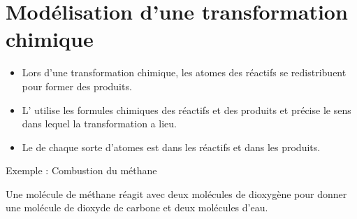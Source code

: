 \documentclass[xcolor={dvipsnames}]{beamer}
\begin{document}
\section{Modélisation d'une transformation chimique}
\begin{frame}
	\begin{alertblock}{}
		\begin{itemize}
			\item Lors d'une transformation chimique, les atomes des réactifs se redistribuent pour former des produits.\pause
			\item L' utilise les formules chimiques des réactifs et des produits et précise le sens dans lequel la transformation a lieu.\pause
			\item Le  de chaque sorte d'atomes est  dans les réactifs et dans les produits. \pause
		\end{itemize}
	\end{alertblock}


	\begin{exampleblock}{Exemple : Combustion du méthane}
	
	
	\begin{center}
		\pause
	\end{center}
	
	Une molécule de méthane réagit avec deux molécules de dioxygène pour donner une molécule de dioxyde de carbone et deux molécules d'eau.
	\end{exampleblock}

\end{frame}
\end{document}
